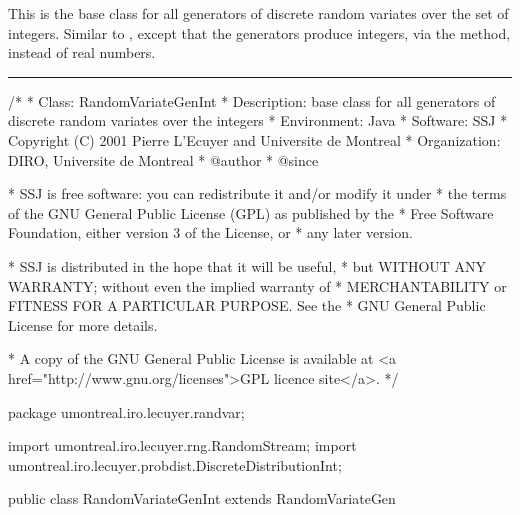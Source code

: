 
This is the base class for all generators of discrete random variates
over the set of integers.
Similar to , except that the generators
produce integers, via the  method, instead of real numbers.


\bigskip\hrule

\begin{code}
\begin{hide}
/*
 * Class:        RandomVariateGenInt
 * Description:  base class for all generators of discrete random variates
over the integers
 * Environment:  Java
 * Software:     SSJ
 * Copyright (C) 2001  Pierre L'Ecuyer and Universite de Montreal
 * Organization: DIRO, Universite de Montreal
 * @author
 * @since

 * SSJ is free software: you can redistribute it and/or modify it under
 * the terms of the GNU General Public License (GPL) as published by the
 * Free Software Foundation, either version 3 of the License, or
 * any later version.

 * SSJ is distributed in the hope that it will be useful,
 * but WITHOUT ANY WARRANTY; without even the implied warranty of
 * MERCHANTABILITY or FITNESS FOR A PARTICULAR PURPOSE.  See the
 * GNU General Public License for more details.

 * A copy of the GNU General Public License is available at
   <a href="http://www.gnu.org/licenses">GPL licence site</a>.
 */
\end{hide}
package umontreal.iro.lecuyer.randvar;\begin{hide}
import umontreal.iro.lecuyer.rng.RandomStream;
import umontreal.iro.lecuyer.probdist.DiscreteDistributionInt;\end{hide}

public class RandomVariateGenInt extends RandomVariateGen\begin{hide} {

\end{hide}
\end{code}

